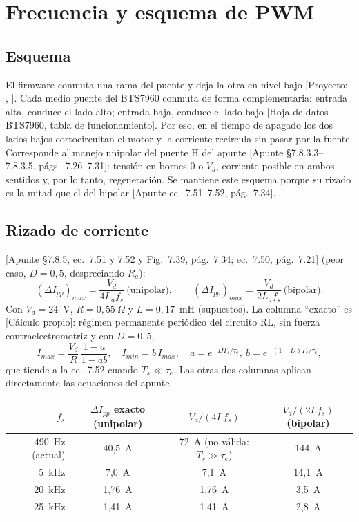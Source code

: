 \documentclass[11pt,a4paper]{article}
\newcommand{\code}[1]{\texttt{\detokenize{#1}}}
\newcommand{\fuente}[1]{{\footnotesize\textcolor{black!60}{[#1]}}}
\begin{document}
\section{Frecuencia y esquema de PWM}
\label{sec:pwm}

\subsection{Esquema}
El firmware conmuta una rama del puente y deja la otra en nivel bajo \fuente{Proyecto: \code{include/MotorDriver.h}, \code{setPWM}}. Cada medio puente del BTS7960 conmuta de forma complementaria: entrada alta, conduce el lado alto; entrada baja, conduce el lado bajo \fuente{Hoja de datos BTS7960, tabla de funcionamiento}. Por eso, en el tiempo de apagado los dos lados bajos cortocircuitan el motor y la corriente recircula sin pasar por la fuente. Corresponde al manejo unipolar del puente H del apunte \fuente{Apunte §7.8.3.3--7.8.3.5, págs.~7.26--7.31}: tensión en bornes $0$ o $V_d$, corriente posible en ambos sentidos y, por lo tanto, regeneración. Se mantiene este esquema porque su rizado es la mitad que el del bipolar \fuente{Apunte ec.~7.51--7.52, pág.~7.34}.

\subsection{Rizado de corriente}
\fuente{Apunte §7.8.5, ec.~7.51 y 7.52 y Fig.~7.39, pág.~7.34; ec.~7.50, pág.~7.21} (peor caso, $D=0{,}5$, despreciando $R_a$):
\begin{equation}
(\Delta I_{pp})_{max}=\frac{V_d}{4L_af_s}\ \text{(unipolar)},\qquad
(\Delta I_{pp})_{max}=\frac{V_d}{2L_af_s}\ \text{(bipolar)}.
\end{equation}
Con $V_d=24$~V, $R=0{,}55~\Omega$ y $L=0{,}17$~mH (supuestos). La columna ``exacto'' es \fuente{Cálculo propio}: régimen permanente periódico del circuito RL, sin fuerza contraelectromotriz y con $D=0{,}5$,
\[
I_{max}=\frac{V_d}{R}\,\frac{1-a}{1-ab},\quad I_{min}=b\,I_{max},\quad
a=e^{-DT_s/\tau_e},\ b=e^{-(1-D)T_s/\tau_e},
\]
que tiende a la ec.~7.52 cuando $T_s\ll\tau_e$. Las otras dos columnas aplican directamente las ecuaciones del apunte.

\begin{center}
\begin{tabular}{rccc}
\toprule
$f_s$ & $\Delta I_{pp}$ exacto (unipolar) & $V_d/(4Lf_s)$ & $V_d/(2Lf_s)$ (bipolar) \\
\midrule
490~Hz (actual) & 40,5~A & 72~A (no válida: $T_s\gg\tau_e$) & 144~A \\
5~kHz & 7,0~A & 7,1~A & 14,1~A \\
20~kHz & 1,76~A & 1,76~A & 3,5~A \\
25~kHz & 1,41~A & 1,41~A & 2,8~A \\
\bottomrule
\end{tabular}
\end{center}
\end{document}
